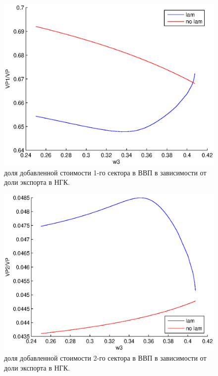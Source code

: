\documentclass[12pt]{article}
\theoremstyle{rusdef}
\begin{document}
\begin{figure}[h!]
	\centering
	\includegraphics[scale=0.8]{pics/w3_VP1-VP.eps}
	\caption{доля добавленной стоимости 1-го сектора в ВВП в зависимости от доли
		экспорта в НГК.}
\end{figure}
\begin{figure}[h!]
	\centering
	\includegraphics[scale=0.8]{pics/w3_VP2-VP.eps}
	\caption{доля добавленной стоимости 2-го сектора в ВВП в зависимости от доли
		экспорта в НГК.}
\end{figure}
\end{document}
